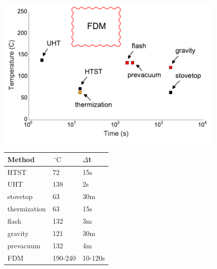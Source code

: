 \documentclass[fleqn,10pt]{wlpeerj}
\begin{document}
\begin{figure}
  \begin{minipage}[c]{0.60\linewidth}
    \centering
    \includegraphics[width=\textwidth]{Pasteurization}
    \par\vspace{0pt}
  \end{minipage}%
  \begin{minipage}[c]{0.40\linewidth}
    \centering%
    
    \begin{tabular}{@{}lll@{}}
    \toprule
    Method       & $\,^{\circ}\mathrm{C}$ & $\Delta$t \\ \midrule
    HTST         & 72      & 15s    \\
    UHT          & 138     & 2s     \\
    stovetop     & 63      & 30m    \\
    thermization & 63      & 15s    \\
    flash        & 132     & 3m     \\
    gravity      & 121     & 30m    \\
    prevacuum    & 132     & 4m     \\
    FDM          & 190-240 & 10-120s\\ \bottomrule
    \end{tabular}


\end{minipage}
\end{figure}
\end{document}

